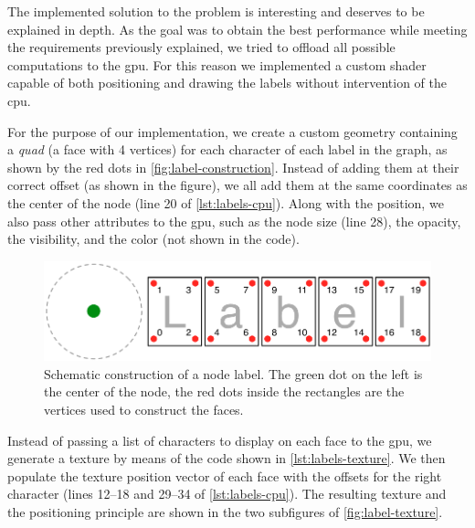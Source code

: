 The implemented solution to the problem is interesting and deserves to be explained in depth. As the goal was to obtain the best performance while meeting the requirements previously explained, we tried to offload all possible computations to the \gls{gpu}. For this reason we implemented a custom shader capable of both positioning and drawing the labels without intervention of the \gls{cpu}.

For the purpose of our implementation, we create a custom geometry containing a \emph{quad} (a face with 4 vertices) for each character of each label in the graph, as shown by the red dots in \vref{fig:label-construction}. Instead of adding them at their correct offset (as shown in the figure), we all add them at the same coordinates as the center of the node (line 20 of \vref{lst:labels-cpu}). Along with the position, we also pass other attributes to the \gls{gpu}, such as the node size (line 28), the opacity, the visibility, and the color (not shown in the code).

\begin{figure}[p]
  \centering
  \includegraphics[width=.8\linewidth]{images/label-construction}
  \caption[Construction of the label for a node.]{Schematic construction of a node label. The green dot on the left is the center of the node, the red dots inside the rectangles are the vertices used to construct the faces.}
  \label{fig:label-construction}
\end{figure}

Instead of passing a list of characters to display on each face to the \gls{gpu}, we generate a texture by means of the code shown in \ref{lst:labels-texture}. We then populate the texture position vector of each face with the offsets for the right character (lines 12--18 and 29--34 of \ref{lst:labels-cpu}). The resulting texture and the positioning principle are shown in the two subfigures of \vref{fig:label-texture}.

